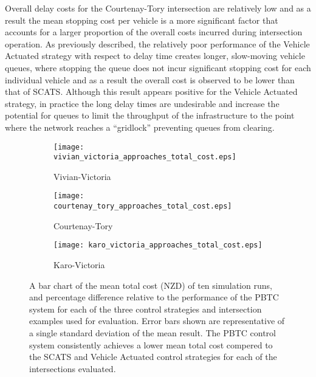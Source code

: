 Overall delay costs for the Courtenay-Tory intersection are relatively low and as a result  the mean stopping cost per vehicle is a more significant factor that accounts for a larger proportion of the overall costs incurred during intersection operation. As previously described, the relatively poor performance of the Vehicle Actuated strategy with respect to delay time creates longer, slow-moving vehicle queues, where stopping the queue does not incur significant stopping cost for each individual vehicle and as a result the overall cost is observed to be lower than that of SCATS. Although this result appears positive for the Vehicle Actuated strategy, in practice the long delay times are undesirable and increase the potential for queues to limit the throughput of the infrastructure to the point where the network reaches a ``gridlock'' preventing queues from clearing. 

\begin{figure}
\centering
\begin{subfigure}{.5\textwidth}
  \centering
  \texttt{[image: vivian\_victoria\_approaches\_total\_cost.eps]}
  \caption{Vivian-Victoria}
  \label{total_cost:sub1}
\end{subfigure}%
\begin{subfigure}{.5\textwidth}
  \centering
  \texttt{[image: courtenay\_tory\_approaches\_total\_cost.eps]}
  \caption{Courtenay-Tory}
  \label{total_cost:sub2}
\end{subfigure}

\vspace{1cm}

\begin{subfigure}{.5\textwidth}
  \centering
  \texttt{[image: karo\_victoria\_approaches\_total\_cost.eps]}
  \caption{Karo-Victoria}
  \label{total_cost:sub3}
\end{subfigure}%
\caption[Results of measuring the overall costs incurred each evaluation control strategy and intersection.]{A bar chart of the mean total cost (NZD) of ten simulation runs, and percentage difference relative to the performance of the PBTC system for each of the three control strategies and intersection examples used for evaluation. Error bars shown are representative of a single standard deviation of the mean result. The PBTC control system consistently achieves a lower mean total cost compered to the SCATS and Vehicle Actuated control strategies for each of the intersections evaluated. }
\label{eval:total_cost}
\end{figure}

